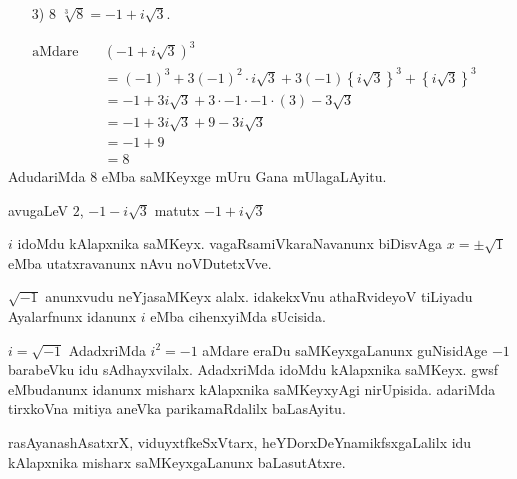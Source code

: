 \begin{itemize}
\item[{\rm 3)}] 8  $\sqrt[3]{8} = -1 +i\sqrt{3}$.
\end{itemize}
\begin{align*}
\text{aMdare}\quad &(-1+i\sqrt{3})^3&\\
&= (-1)^3 + 3(-1)^2\cdot i\sqrt{3}+3(-1)\left\{i\sqrt{3}\right\}^3 + \left\{i\sqrt{3}\right\}^3\\
&= -1 + 3i\sqrt{3} +3\cdot -1\cdot -1 \cdot (3) - 3\sqrt{3}\\
&= -1+3i\sqrt{3}+9 -3i\sqrt{3}\\
&= -1+9\\
&= 8
\end{align*}
AdudariMda $8$ eMba saMKeyxge mUru Gana mUlagaLAyitu.

avugaLeV $2$, $-1-i\sqrt{3}$ \;matutx\; $-1+i\sqrt{3}$ 

$i$ idoMdu kAlapxnika saMKeyx. vagaRsamiVkaraNavanunx biDisvAga $x =\pm \sqrt{1}$ eMba utatxravanunx nAvu noVDutetxVve.

$\sqrt{-1}$ anunxvudu neYjasaMKeyx alalx. idakekxVnu athaRvideyoV tiLiyadu Ayalarfnunx idanunx $i$ eMba cihenxyiMda sUcisida.

$i=\sqrt{-1}$ AdadxriMda $i^2=-1$ aMdare eraDu saMKeyxgaLanunx guNisidAge $-1$ barabeVku idu sAdhayxvilalx. AdadxriMda idoMdu kAlapxnika saMKeyx. gwsf eMbudanunx idanunx misharx kAlapxnika saMKeyxyAgi nirUpisida. adariMda tirxkoVna mitiya aneVka parikamaRdalilx baLasAyitu.

rasAyanashAsatxrX, viduyxtfkeSxVtarx, heYDorxDeYnamikfsxgaLalilx idu kAlapxnika misharx saMKeyx\-gaLanunx baLasutAtxre.
